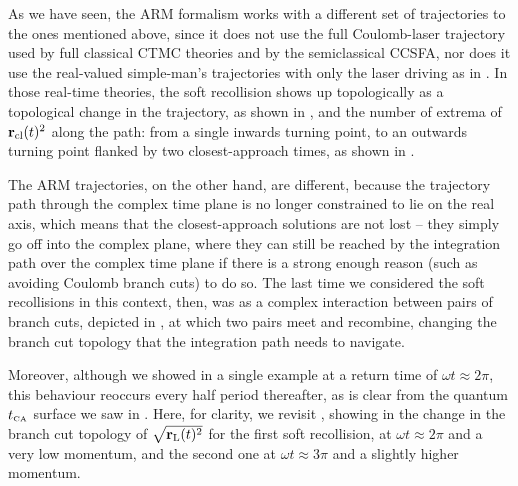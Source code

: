 As we have seen, the ARM formalism works with a different set of trajectories to the ones mentioned above, since it does not use the full Coulomb-laser trajectory used by full classical CTMC theories and by the semiclassical CCSFA, nor does it use the real-valued simple-man's trajectories with only the laser driving as in . In those real-time theories, the soft recollision shows up topologically as a topological change in the trajectory, as shown in , and the number of extrema of $\vb{r}_{\mathrm{cl}}(t)^2$ along the path: from a single inwards turning point, to an outwards turning point flanked by two closest-approach times, as shown in .

The ARM trajectories, on the other hand, are different, because the trajectory path through the complex time plane is no longer constrained to lie on the real axis, which means that the closest-approach solutions are not lost -- they simply go off into the complex plane, where they can still be reached by the integration path over the complex time plane if there is a strong enough reason (such as avoiding Coulomb branch cuts) to do so. The last time we considered the soft recollisions in this context, then, was as a complex interaction between pairs of branch cuts, depicted in , at which two pairs meet and recombine, changing the branch cut topology that the integration path needs to navigate.


Moreover, although we showed in  a single example at a return time of $\omega t\approx 2\pi$, this behaviour reoccurs every half period thereafter, as is clear from the quantum ${t_{\scriptscriptstyle\mathrm{CA}}}$ surface we saw in . Here, for clarity, we revisit , showing in  the change in the branch cut topology of $\sqrt{\vb{r}_\mathrm{L}(t)^2}$ for the first soft recollision, at $\omega t\approx 2\pi$ and a very low momentum, and the second one at $\omega t\approx 3\pi$ and a slightly higher momentum.


\captionsetup[figure]{position=top}

